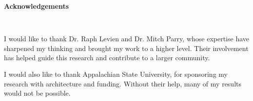 \vspace*{0.5in}
\begin{center}
    \textbf{Acknowledgements}\\[2ex]
\end{center}

\begin{doublespace}
I would like to thank Dr. Raph Levien and Dr. Mitch Parry, whose expertise have sharpened my thinking and brought my work to a higher level. Their involvement has helped guide this research and contribute to a larger community.

\bigskip
I would also like to thank Appalachian State University, for sponsoring my research with architecture and funding. Without their help, many of my results would not be possible.
\end{doublespace}